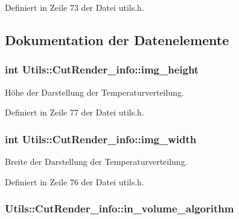Definiert in Zeile 73 der Datei utils.\-h.



\subsection{Dokumentation der Datenelemente}
\hypertarget{structUtils_1_1CutRender__info_abac1c3e4edb7183017ecfa7b69c40d25}{
\subsubsection[{img\-\_\-height}]{\setlength{\rightskip}{0pt plus 5cm}int Utils\-::\-Cut\-Render\-\_\-info\-::img\-\_\-height}}\label{structUtils_1_1CutRender__info_abac1c3e4edb7183017ecfa7b69c40d25}


Höhe der Darstellung der Temperaturverteilung. 



Definiert in Zeile 77 der Datei utils.\-h.

\hypertarget{structUtils_1_1CutRender__info_ac7a1e2c64129630affaf208808a190eb}{
\subsubsection[{img\-\_\-width}]{\setlength{\rightskip}{0pt plus 5cm}int Utils\-::\-Cut\-Render\-\_\-info\-::img\-\_\-width}}\label{structUtils_1_1CutRender__info_ac7a1e2c64129630affaf208808a190eb}


Breite der Darstellung der Temperaturverteilung. 



Definiert in Zeile 76 der Datei utils.\-h.

\hypertarget{structUtils_1_1CutRender__info_af2ee1118ac14a73a2a350a05102013ab}{
\subsubsection[{in\-\_\-volume\-\_\-algorithm}]{ Utils\-::\-Cut\-Render\-\_\-info\-::in\-\_\-volume\-\_\-algorithm}}\label{structUtils_1_1CutRender__info_af2ee1118ac14a73a2a350a05102013ab}


